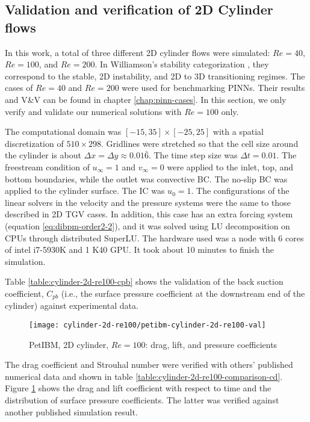 \subsection*{Validation and verification of 2D Cylinder flows}

In this work, a total of three different 2D cylinder flows were simulated: $Re=40$, $Re=100$, and $Re=200$.
In Williamson's stability categorization \cite{williamson_vortex_1996}, they correspond to the stable, 2D instability, and 2D to 3D transitioning regimes.
The cases of $Re=40$ and $Re=200$ were used for benchmarking PINNs.
Their results and V\&V can be found in chapter \ref{chap:pinn-cases}.
In this section, we only verify and validate our numerical solutions with $Re=100$ only.

The computational domain was $[-15, 35]\times[-25, 25]$ with a spatial discretization of $510 \times 298$.
Gridlines were stretched so that the cell size around the cylinder is about $\Delta x = \Delta y \approx 0.01\bar{6}$.
The time step size was $\Delta t = 0.01$.
The freestream condition of $u_{\infty}=1$ and $v_{\infty}=0$ were applied to the inlet, top, and bottom boundaries, while the outlet was convective BC.
The no-slip BC was applied to the cylinder surface.
The IC was $u_0=1$.
The configurations of the linear solvers in the velocity and the pressure systems were the same to those described in 2D TGV cases.
In addition, this case has an extra forcing system (equation \eqref{eq:dibpm-order2-2}), and it was solved using LU decomposition on CPUs through distributed SuperLU.
The hardware used was a node with 6 cores of intel i7-5930K and 1 K40 GPU.
It took about 10 minutes to finish the simulation.

Table \ref{table:cylinder-2d-re100-cpb} shows the validation of the back suction coefficient, $C_{pb}$ (i.e., the surface pressure coefficient at the downstream end of the cylinder) against experimental data.


\begin{figure}[hbt!]
    \texttt{[image: cylinder-2d-re100/petibm-cylinder-2d-re100-val]}
    \caption{PetIBM, 2D cylinder, $Re=100$: drag, lift, and pressure coefficients}
    \label{fig:petibm-cylinder-2d-re100-val}
\end{figure}
The drag coefficient and Strouhal number were verified with others' published numerical data and shown in table \ref{table:cylinder-2d-re100-comparison-cd}.
Figure \ref{fig:petibm-cylinder-2d-re100-val} shows the drag and lift coefficient with respect to time and the distribution of surface pressure coefficients.
The latter was verified against another published simulation result.

